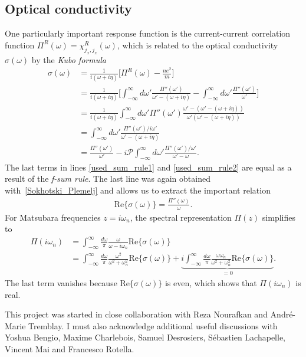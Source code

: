 \documentclass[notitlepage,11pt,nofootinbib]{revtex4-1}
\begin{document}
\subsection{Optical conductivity}

One particularly important response function is the current-current correlation function $\Pi^R(\omega) = \chi_{j_x,j_x}^R(\omega)$, which is related to the optical conductivity $\sigma(\omega)$ by the \emph{Kubo formula}
\begin{align}
\sigma(\omega)
&=
\frac{1}{i(\omega + i\eta)}\bigg[\Pi^R(\omega)-\frac{ne^2}{m}\bigg]
\label{used_sum_rule1}
\\
&=
\frac{1}{i(\omega + i\eta)}
\bigg[
\int_{-\infty}^{\infty}d\omega'\frac{\Pi''(\omega')}{\omega'-(\omega+i\eta)}
-\int_{-\infty}^{\infty}d\omega'\frac{\Pi''(\omega')}{\omega'}
\bigg]
\label{used_sum_rule2}
\\
&=
\frac{1}{i(\omega + i\eta)}
\int_{-\infty}^{\infty}d\omega'
\Pi''(\omega') 
\frac{\omega'-(\omega'-(\omega+i\eta))}{\omega'(\omega'-(\omega+i\eta))}
\\
&=
\int_{-\infty}^{\infty}d\omega'\frac{\Pi''(\omega')/i\omega'}{\omega'-(\omega+i\eta)}
\\
&=
\frac{\Pi''(\omega')}{\omega'}
-i\mathcal P \int_{-\infty}^{\infty}d\omega'\frac{\Pi''(\omega')/\omega'}{\omega'-\omega}.
\label{conductivity_spectral}
\end{align}
The last terms in lines \eqref{used_sum_rule1} and \eqref{used_sum_rule2} are equal as a result of the \emph{f-sum rule}. The last line was again obtained with~\eqref{Sokhotski_Plemelj} and allows us to extract the important relation
\begin{align}
\text{Re}\{ \sigma(\omega) \} = \frac{\Pi''(\omega)}{\omega}.
\end{align}
For Matsubara frequencies $z=i\omega_n$, the spectral representation $\Pi(z)$ simplifies to
\begin{align}
\Pi(i\omega_n) 
&=
\int_{-\infty}^{\infty} \frac{d\omega}{\pi}\frac{\omega}{\omega-i\omega_n}\text{Re}\{ \sigma(\omega) \}
\label{chkpt_Pi_continuation_1}
\\
&=
\int_{-\infty}^{\infty} \frac{d\omega}{\pi} \frac{\omega^2}{\omega^2+\omega_n^2}
\text{Re}\{ \sigma(\omega) \}
+
\underbrace{i
\int_{-\infty}^{\infty} \frac{d\omega}{\pi} \frac{\omega\omega_n}{\omega^2+\omega_n^2}
\text{Re}\{ \sigma(\omega) \}
}_{=0}.
\label{chkpt_Pi_continuation}
\end{align}
The last term vanishes because $\text{Re}\{\sigma(\omega)\}$ is even, which shows that $\Pi(i\omega_n)$ is real. 




\begin{acknowledgments}
This project was started in close collaboration with Reza Nourafkan and André-Marie Tremblay. I must also acknowledge additional useful discussions with Yoshua Bengio, Maxime Charlebois, Samuel Desrosiers, Sébastien Lachapelle, Vincent Mai and Francesco Rotella.
\end{acknowledgments}


\end{document}
